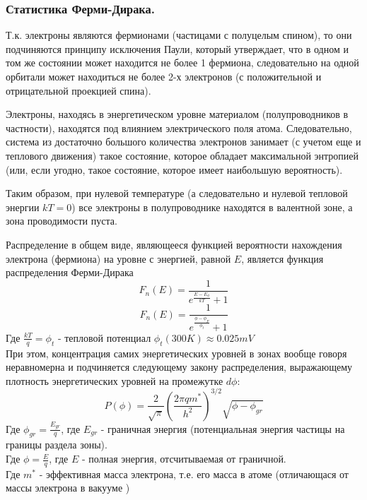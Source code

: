 \subsubsection{Статистика Ферми-Дирака.}
Т.к. электроны являются фермионами (частицами с полуцелым спином), то они подчиняются принципу исключения Паули, который утверждает, что в одном и том же состоянии может находится не более 1 фермиона, следовательно на одной орбитали может находиться не более 2-х электронов (с положительной и отрицательной проекцией спина).


Электроны, находясь в энергетическом уровне материалом (полупроводников в частности), находятся под влиянием электрического поля атома. Следовательно, система из достаточно большого количества электронов занимает (с учетом еще и теплового движения) такое состояние, которое обладает максимальной энтропией (или, если угодно, такое состояние, которое имеет наибольшую вероятность).


Таким образом, при нулевой температуре (а следовательно и нулевой тепловой энергии $kT = 0$) все электроны в полупроводнике находятся в валентной зоне, а зона проводимости пуста.

Распределение в общем виде, являющееся функцией вероятности нахождения электрона (фермиона) на уровне с энергией, равной $E$, является функция распределения Ферми-Дирака
\begin{equation}
F_n(E) = \frac{1}{e^{\frac{E-E_{\phi}}{kT}}+1}
\end{equation}
\begin{equation}
F_n(E) = \frac{1}{e^{\frac{\phi - \phi_F}{\phi_t}}+1}
\end{equation}
Где $\frac{kT}{q} = \phi_t$ -	 тепловой потенциал $ \phi_t(300 K)\approx 0.025 mV$\\

При этом, концентрация самих энергетических уровней в зонах вообще говоря неравномерна и подчиняется следующему закону распределения, выражающему плотность энергетических уровней на промежутке $d\phi$:
\begin{equation}
P(\phi) = \frac{2}{\sqrt{\pi}} (\frac{2 \pi q m^*}{h^2})^{3/2} \sqrt{\phi - \phi_{gr}}
\end{equation}
Где $\phi_{gr} = \frac{E_{gr}}{q}$, где $E_{gr}$ - граничная энергия (потенциальная энергия частицы на границы раздела зоны).\\ 
Где $\phi = \frac{E}{q}$, где $E$ - полная энергия, отсчитываемая от граничной.\\
Где $m^*$ - эффективная масса электрона, т.е. его масса в атоме (отличающася от массы электрона в вакууме )\\

